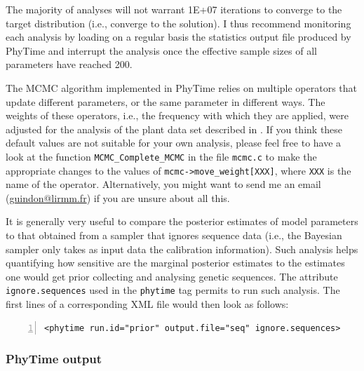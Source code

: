 \documentclass[a4paper,12pt]{article}
\newcommand{\x}[1]{\texttt{#1}}
\begin{document}
The  majority of analyses will not warrant 1E+07 iterations  to converge to the target
distribution (i.e., converge to the solution). I thus recommend  monitoring each analysis by loading
on a regular basis the statistics output file produced by PhyTime and interrupt the analysis once
the effective sample sizes of all parameters have reached 200.  

The MCMC algorithm implemented in
PhyTime relies on multiple operators that update different parameters, or the same parameter in
different ways. The weights of these operators, i.e., the frequency with which they are applied,
were adjusted for the analysis of the plant data set described in \cite{guindon18}. If you think
these default values are not suitable for your own analysis, please feel free to have a look at the
function \x{MCMC\_Complete\_MCMC} in the file \x{mcmc.c} to make  the appropriate changes to the
values of \x{mcmc->move\_weight[XXX]}, where \x{XXX} is the name of the operator. Alternatively, you
might want to send me an email (\url{guindon@lirmm.fr}) if you are unsure about all this. 

It is generally very useful to compare the posterior estimates of model parameters to that obtained
from a sampler that ignores sequence data (i.e., the Bayesian sampler only takes as input data the
calibration information). Such analysis helps quantifying how sensitive are the marginal posterior
estimates to the estimates one would get prior collecting and analysing genetic sequences. The
attribute \x{ignore.sequences} used in the \x{phytime} tag permits to run such analysis. The first
lines of a corresponding XML file would then look as follows:

\vspace{0.2cm}
\begin{Verbatim}[frame=single, label=Sampling from the prior in PhyTime, samepage=true, baselinestretch=0.5,
  fontsize=\small, numbers=left]
<phytime run.id="prior" output.file="seq" ignore.sequences>
\end{Verbatim}

\subsubsection{PhyTime output}
\end{document}
